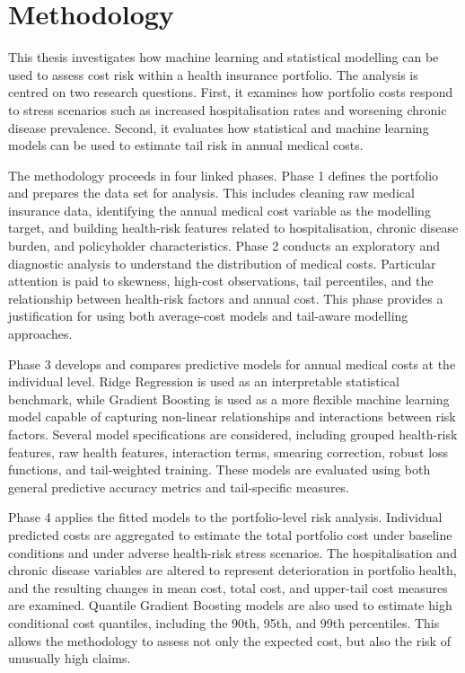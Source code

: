 \section{Methodology}
    
    This thesis investigates how machine learning and statistical modelling can be used to assess cost risk within a health insurance portfolio. The analysis is centred on two research questions. First, it examines how portfolio costs respond to stress scenarios such as increased hospitalisation rates and worsening chronic disease prevalence. Second, it evaluates how statistical and machine learning models can be used to estimate tail risk in annual medical costs.
    
    The methodology proceeds in four linked phases. Phase 1 defines the portfolio and prepares the data set for analysis. This includes cleaning raw medical insurance data, identifying the annual medical cost variable as the modelling target, and building health-risk features related to hospitalisation, chronic disease burden, and policyholder characteristics. Phase 2 conducts an exploratory and diagnostic analysis to understand the distribution of medical costs. Particular attention is paid to skewness, high-cost observations, tail percentiles, and the relationship between health-risk factors and annual cost. This phase provides a justification for using both average-cost models and tail-aware modelling approaches.
    
    Phase 3 develops and compares predictive models for annual medical costs at the individual level. Ridge Regression is used as an interpretable statistical benchmark, while Gradient Boosting is used as a more flexible machine learning model capable of capturing non-linear relationships and interactions between risk factors. Several model specifications are considered, including grouped health-risk features, raw health features, interaction terms, smearing correction, robust loss functions, and tail-weighted training. These models are evaluated using both general predictive accuracy metrics and tail-specific measures.
    
    Phase 4 applies the fitted models to the portfolio-level risk analysis. Individual predicted costs are aggregated to estimate the total portfolio cost under baseline conditions and under adverse health-risk stress scenarios. The hospitalisation and chronic disease variables are altered to represent deterioration in portfolio health, and the resulting changes in mean cost, total cost, and upper-tail cost measures are examined. Quantile Gradient Boosting models are also used to estimate high conditional cost quantiles, including the 90th, 95th, and 99th percentiles. This allows the methodology to assess not only the expected cost, but also the risk of unusually high claims.
    
